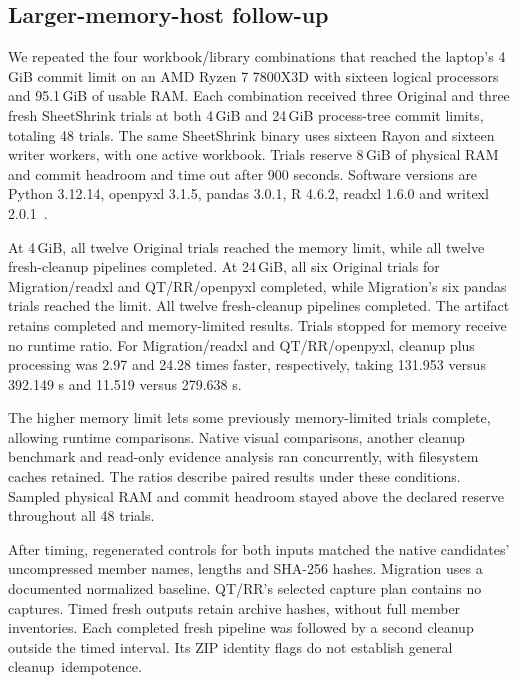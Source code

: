 \subsection{Larger-memory-host follow-up}
We repeated the four workbook/library combinations that reached the laptop's
4\,GiB commit limit on an AMD Ryzen 7 7800X3D with sixteen logical processors and
95.1\,GiB of usable RAM. Each combination received three Original and three fresh
SheetShrink trials at both 4\,GiB and 24\,GiB process-tree commit limits, totaling
48 trials. The same SheetShrink binary uses sixteen Rayon and sixteen writer
workers, with one active workbook. Trials reserve 8\,GiB of physical RAM and
commit headroom and time out after 900 seconds. Software versions are Python
3.12.14, openpyxl 3.1.5, pandas 3.0.1, R 4.6.2, readxl 1.6.0 and
writexl 2.0.1~\cite{openmemoryfollowup}.

At 4\,GiB, all twelve Original trials reached the memory limit, while all twelve
fresh-cleanup pipelines completed. At 24\,GiB, all six Original trials for
Migration/readxl and QT/RR/openpyxl completed, while Migration's six pandas trials
reached the limit. All twelve fresh-cleanup pipelines completed. The artifact
retains completed and memory-limited results. Trials stopped for memory receive
no runtime ratio. For Migration/readxl and QT/RR/openpyxl, cleanup plus processing
was 2.97 and 24.28 times faster, respectively, taking 131.953 versus 392.149 s and
11.519 versus 279.638 s.

The higher memory limit lets some previously memory-limited trials complete,
allowing runtime comparisons. Native visual comparisons, another cleanup benchmark
and read-only evidence analysis ran concurrently, with filesystem caches retained.
The ratios describe paired results under these conditions. Sampled physical RAM
and commit headroom stayed above the declared reserve throughout all 48 trials.

After timing, regenerated controls for both inputs matched the native candidates'
uncompressed member names, lengths and SHA-256 hashes. Migration uses a documented
normalized baseline. QT/RR's selected capture plan contains no captures. Timed
fresh outputs retain archive hashes, without full member inventories. Each
completed fresh pipeline was followed by a second cleanup outside the timed
interval. Its ZIP identity flags do not establish general \mbox{cleanup idempotence}.

